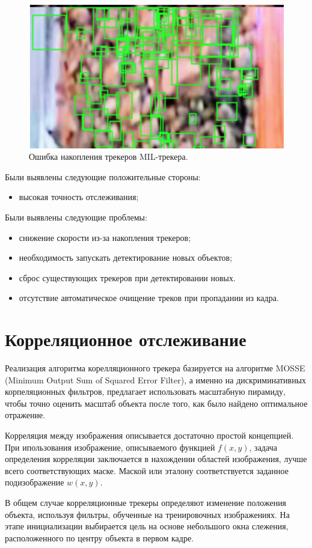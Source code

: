 \documentclass[times]{itmo-student-thesis}
\begin{document}
\begin{figure}[h!]
	\centering
	\includegraphics[width=0.5\linewidth]{images/mil_summ}
	\caption{Ошибка накопления трекеров MIL-трекера.}
	\label{fig:corrsumm}
\end{figure}

Были выявлены следующие положительные стороны:
\begin{itemize}
	\item высокая точность отслеживания;
\end{itemize}
Были выявлены следующие проблемы:
\begin{itemize}
	\item снижение скорости из-за накопления трекеров;
\item  	необходимость запускать детектирование новых объектов;
\item 	сброс существующих трекеров при детектировании новых.
\item 	отсутствие автоматическое очищение треков при пропадании из кадра.
\end{itemize}



\section{Корреляционное отслеживание }
 Реализация алгоритма корелляционного трекера \cite{corrtrack} базируется на алгоритме MOSSE (Minimum Output Sum of Squared Error Filter), а именно на дискриминативных корпеляционных фильтров, предлагает использовать масштабную пирамиду, чтобы точно оценить масштаб объекта после того, как было найдено оптимальное отражение.  
 
 Корреляция между изображения описывается достаточно простой концепцией. При ипользования изображение, описываемого функцией $f(x, y)$, задача определения корреляции заключается в нахождении областей изображения, лучше всего соответствующих маске. Маской или эталону соответствуется заданное подизображение $w(x,y)$.
 
 В общем случае корреляционные трекеры определяют изменение положения объекта, используя фильтры, обученные на тренировочных изображениях. На этапе инициализации выбирается цель на основе небольшого окна слежения, расположенного по центру объекта в первом кадре. 
 
\end{document}

